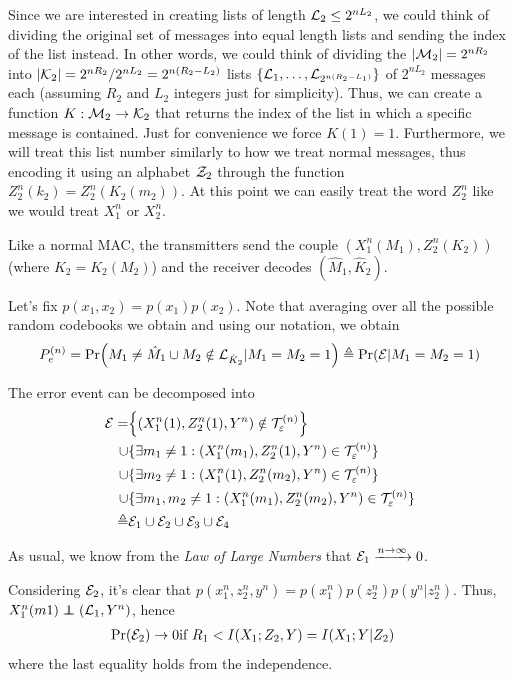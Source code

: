
Since we are interested in creating lists of length $\mathcal{L}_2 \leq 2^{nL_2}$, we could think of dividing the original set of messages into equal length lists and sending the index of the list instead. In other words, we could think of dividing the $|\mathcal{M}_2| = 2^{nR_2}$ into $|\mathcal{K}_2| = 2^{nR_2}/2^{nL_2} = 2^{n(R_2-L_2)}$ lists $\qty{ \mathcal{L}_1, \dots,\mathcal{L}_{2^{n(R_2-L_1)}} }$ of $2^{nL_2}$ messages each (assuming $R_2$ and $L_2$ integers just for simplicity). Thus, we can create a function $K: \mathcal{M}_2 \rightarrow \mathcal{K}_2$ that returns the index of the list in which a specific message is contained. Just for convenience we force $K(1)=1$. Furthermore, we will treat this list number similarly to how we treat normal messages, thus encoding it using an alphabet $\mathcal{Z}_2$ through the function $Z_2^n(k_2) = Z_2^n(K_2(m_2))$. At this point we can easily treat the word $Z_2^n$ like we would treat $X_1^n$ or $X_2^n$.

Like a normal MAC, the transmitters send the couple $(X_1^n(M_1),Z_2^n(K_2))$ (where $K_2 = K_2(M_2)$) and the receiver decodes $(\hat{M}_1,\hat{K}_2)$.

Let's fix $p(x_1,x_2) = p(x_1)p(x_2)$. Note that averaging over all the possible random codebooks we obtain and using our notation, we obtain
%
\begin{equation}
 P_e^{(n)}  = \Pr(M_1 \neq \hat{M}_1 \cup M_2 \notin \mathcal{L}_{\hat{K}_2} | M_1=M_2=1 ) \triangleq \Pr(\mathcal{E} | M_1=M_2=1)
\end{equation}

The error event can be decomposed into
%
\begin{align}
\begin{split}
\mathcal{E} =& \qty{ \qty(X_1^n(1),Z_2^n(1),Y^n) \notin \mathcal{T}_\varepsilon^{(n)}}\\
\cup& \{ \exists m_1\neq 1: (X_1^n(m_1),Z_2^n(1),Y^n) \in \mathcal{T}_\varepsilon^{(n)} \}\\
\cup& \{ \exists m_2\neq 1: (X_1^n(1),Z_2^n(m_2),Y^n) \in \mathcal{T}_\varepsilon^{(n)} \}\\
\cup& \{ \exists m_1,m_2\neq 1: (X_1^n(m_1),Z_2^n(m_2),Y^n) \in \mathcal{T}_\varepsilon^{(n)} \}\\
\triangleq& \mathcal{E}_1 \cup \mathcal{E}_2 \cup \mathcal{E}_3 \cup \mathcal{E}_4
\end{split}
\end{align}

As usual, we know from the \textit{Law of Large Numbers} that $\mathcal{E}_1 \xrightarrow{n \rightarrow \infty} 0$.

Considering $\mathcal{E}_2$, it's clear that $p(x_1^n,z_2^n,y^n) = p(x_1^n)p(z_2^n)p(y^n|z_2^n)$. Thus, $X_1^n(m1) \independent (\LL_1,Y^n)$, hence
%
\begin{eqnarray}
\Pr(\mathcal{E}_2) \rightarrow 0 & \text{if } R_1 < I(X_1;Z_2,Y) = I(X_1;Y|Z_2)
\end{eqnarray}
%
where the last equality holds from the independence.

